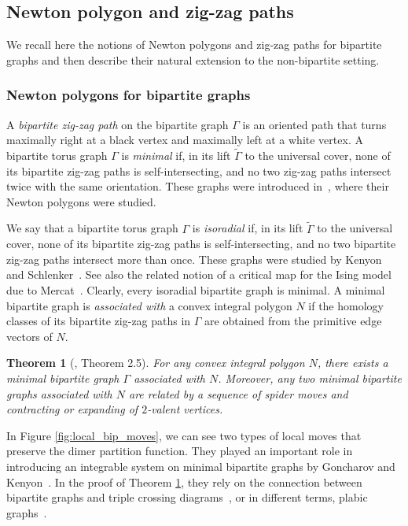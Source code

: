 \documentclass[12pt,a4paper]{article}
\newtheorem{thm}{Theorem}
\theoremstyle{definition}
\begin{document}
\subsection{Newton polygon and zig-zag paths}

We recall here the notions of Newton polygons and zig-zag paths for bipartite graphs and then describe their natural extension to the non-bipartite setting.

\subsubsection*{Newton polygons for bipartite graphs}

A \emph{bipartite zig-zag path} on the bipartite graph $\Gamma$ is an oriented path that turns maximally right at a black vertex and maximally left at a white vertex. A bipartite torus graph $\Gamma$ is \emph{minimal} if, in its lift $\tilde\Gamma$ to the universal cover, none of its bipartite zig-zag paths is self-intersecting, and no two zig-zag paths intersect twice with the same orientation. These graphs were introduced in~\cite{GoncharovKenyon}, where their Newton polygons were studied.  

We say that a bipartite torus graph $\Gamma$ is \emph{isoradial} if, in its lift $\tilde\Gamma$ to the universal cover, none of its bipartite zig-zag paths is self-intersecting, and no two bipartite zig-zag paths intersect more than once. These graphs were studied by Kenyon and Schlenker~\cite{KenyonSchlenker}. See also the related notion of a critical map for the Ising model due to Mercat~\cite{Mercat01}. Clearly, every isoradial bipartite graph is minimal. A minimal bipartite graph is \emph{associated with} a convex integral polygon $N$ if the homology classes of its bipartite zig-zag paths in $\Gamma$ are obtained from the primitive edge vectors of $N$.

\begin{thm} [\cite{GoncharovKenyon}, Theorem 2.5] \label{polygons_graphs GK}
    For any convex integral polygon $N$, there exists a minimal bipartite graph $\Gamma$ associated with $N$. Moreover, any two minimal bipartite graphs associated with $N$ are related by a sequence of spider moves and contracting or expanding of $2$-valent vertices.
\end{thm}

In Figure \ref{fig:local_bip_moves}, we can see two types of local moves that preserve the dimer partition function. They played an important role in introducing an integrable system on minimal bipartite graphs by Goncharov and Kenyon~\cite{GoncharovKenyon}. In the proof of Theorem \ref{polygons_graphs GK}, they rely on the connection between bipartite graphs and triple crossing diagrams~\cite{DThurston}, or in different terms, plabic graphs~\cite{Pos06}.
\end{document}
